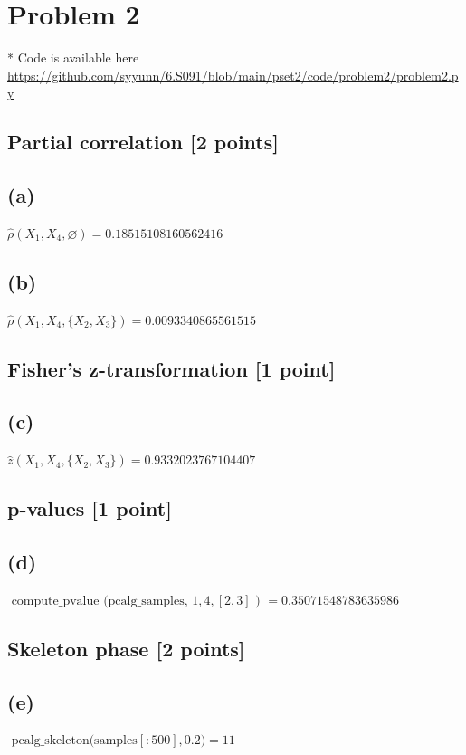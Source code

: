 \documentclass[10pt]{article}
\begin{document}
\section{Problem 2}

* Code is available here \url{https://github.com/syyunn/6.S091/blob/main/pset2/code/problem2/problem2.py}

\subsection{Partial correlation [2 points]}
\subsection{(a)}
$\hat{\rho}\left(X_1, X_4, \varnothing\right) = 0.18515108160562416$

\subsection{(b)}
$\hat{\rho}\left(X_1, X_4, \{X_2, X_3\}\right) = 0.0093340865561515$

\subsection{Fisher’s z-transformation [1 point]}
\subsection{(c)}
$\hat{z}\left(X_1, X_4, \{X_2, X_3\}\right) = 0.9332023767104407$

\subsection{p-values [1 point]}
\subsection{(d)}
$\text { compute\_pvalue (pcalg\_samples, } 1,4,[2,3] \text { ) } = 0.35071548783635986$

\subsection{Skeleton phase [2 points]}
\subsection*{(e)}
$\text { pcalg\_skeleton(samples}[: 500], 0.2) = 11$
\end{document}
